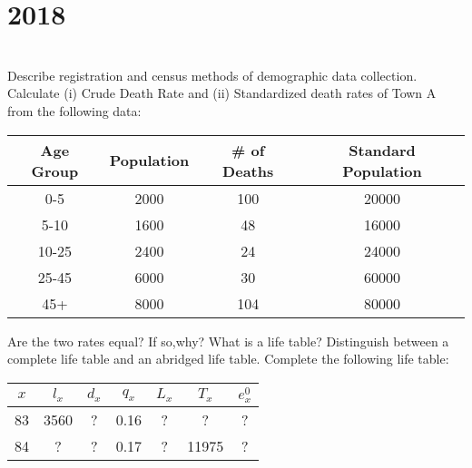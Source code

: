 \section*{2018}
\vspace{-.5cm}
\hrulefill \smallskip\\
 Describe registration and census methods of demographic data collection.
\myline
{} Calculate (i) Crude Death Rate and (ii) Standardized death rates of Town A from the following data:
\begin{center}
    \begin{tabular}{|*{4}{c|}}\hline
    Age Group & Population & \# of Deaths & Standard Population \\ \hline
    0-5 & 2000 & 100 & 20000 \\ \hline
    5-10 & 1600 & 48 & 16000 \\ \hline
    10-25 & 2400 & 24 & 24000 \\ \hline
    25-45 & 6000 & 30 & 60000 \\ \hline
    45+ & 8000 & 104 & 80000\\ \hline
    \end{tabular}
\end{center} Are the two rates equal? If so,why?
\myline
{} What is a life table? Distinguish between a complete life table and an abridged life table. Complete the following life table:
\begin{center}
    \begin{tabular}{|*{7}{c|}}\hline
        $x$ & $l_x$ & $d_x$ & $q_x$ & $L_x$ & $T_x$ & $e_x^0$\\ \hline
        83 & 3560 & ? & 0.16 & ? & ? & ?\\ \hline
        84 & ? & ? & 0.17 & ? & 11975 & ? \\ \hline
    \end{tabular}
\end{center}


